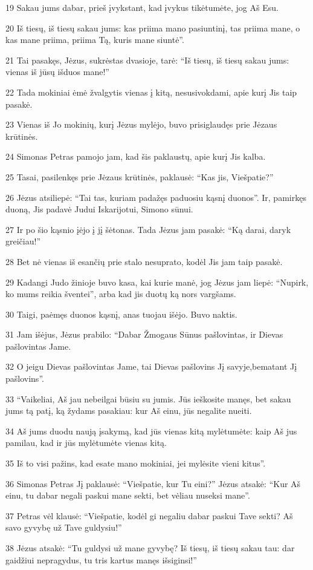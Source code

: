 \par 19 Sakau jums dabar, prieš įvykstant, kad įvykus tikėtumėte, jog Aš Esu. 
\par 20 Iš tiesų, iš tiesų sakau jums: kas priima mano pasiuntinį, tas priima mane, o kas mane priima, priima Tą, kuris mane siuntė”. 
\par 21 Tai pasakęs, Jėzus, sukrėstas dvasioje, tarė: “Iš tiesų, iš tiesų sakau jums: vienas iš jūsų išduos mane!” 
\par 22 Tada mokiniai ėmė žvalgytis vienas į kitą, nesusivokdami, apie kurį Jis taip pasakė. 
\par 23 Vienas iš Jo mokinių, kurį Jėzus mylėjo, buvo prisiglaudęs prie Jėzaus krūtinės. 
\par 24 Simonas Petras pamojo jam, kad šis paklaustų, apie kurį Jis kalba. 
\par 25 Tasai, pasilenkęs prie Jėzaus krūtinės, paklausė: “Kas jis, Viešpatie?” 
\par 26 Jėzus atsiliepė: “Tai tas, kuriam padažęs paduosiu kąsnį duonos”. Ir, pamirkęs duoną, Jis padavė Judui Iskarijotui, Simono sūnui. 
\par 27 Ir po šio kąsnio įėjo į jį šėtonas. Tada Jėzus jam pasakė: “Ką darai, daryk greičiau!” 
\par 28 Bet nė vienas iš esančių prie stalo nesuprato, kodėl Jis jam taip pasakė. 
\par 29 Kadangi Judo žinioje buvo kasa, kai kurie manė, jog Jėzus jam liepė: “Nupirk, ko mums reikia šventei”, arba kad jis duotų ką nors vargšams. 
\par 30 Taigi, paėmęs duonos kąsnį, anas tuojau išėjo. Buvo naktis. 
\par 31 Jam išėjus, Jėzus prabilo: “Dabar Žmogaus Sūnus pašlovintas, ir Dievas pašlovintas Jame. 
\par 32 O jeigu Dievas pašlovintas Jame, tai Dievas pašlovins Jį savyje,­bematant Jį pašlovins”. 
\par 33 “Vaikeliai, Aš jau nebeilgai būsiu su jumis. Jūs ieškosite manęs, bet sakau jums tą patį, ką žydams pasakiau: kur Aš einu, jūs negalite nueiti. 
\par 34 Aš jums duodu naują įsakymą, kad jūs vienas kitą mylėtumėte: kaip Aš jus pamilau, kad ir jūs mylėtumėte vienas kitą. 
\par 35 Iš to visi pažins, kad esate mano mokiniai, jei mylėsite vieni kitus”. 
\par 36 Simonas Petras Jį paklausė: “Viešpatie, kur Tu eini?” Jėzus atsakė: “Kur Aš einu, tu dabar negali paskui mane sekti, bet vėliau nuseksi mane”. 
\par 37 Petras vėl klausė: “Viešpatie, kodėl gi negaliu dabar paskui Tave sekti? Aš savo gyvybę už Tave guldysiu!” 
\par 38 Jėzus atsakė: “Tu guldysi už mane gyvybę? Iš tiesų, iš tiesų sakau tau: dar gaidžiui nepragydus, tu tris kartus manęs išsiginsi!”



